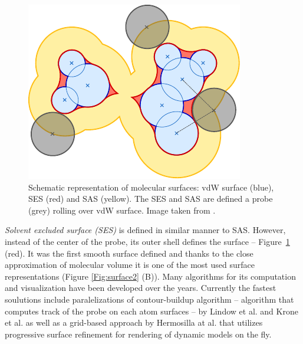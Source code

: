 \begin{figure} 
\vspace{-20pt}
\begin{center}
  \includegraphics[width=\linewidth]{pictures/surface.pdf} 
  \caption{Schematic representation of molecular surfaces: vdW surface (blue), SES (red) and SAS (yellow). The SES and SAS are defined a probe (grey) rolling over vdW surface. Image taken from \cite{kozlikova2015visualization}.}
  \label{Fig:surface}  
\end{center}
\vspace{-20pt}
\end{figure}

\textit{Solvent excluded surface (SES)} \cite{richards1977areas} is defined in similar manner to SAS. However, instead of the center of the probe, its outer shell defines the surface -- Figure~\ref{Fig:surface} (red). It was the first smooth surface defined and thanks to the close approximation of molecular volume it is one of the most used surface representations (Figure \ref{Fig:surface2} (B)). Many algorithms for its computation and visualization have been developed over the years. Currently the fastest soulutions include paralelizations of contour-buildup algorithm \cite{totrov1996contour} -- algorithm that computes track of the probe on each atom surfaces -- by Lindow et al. \cite{lindow2010accelerated} and Krone et al. \cite{6094043} as well as a grid-based approach by Hermosilla at al. \cite{hermosilla2017interactive} that utilizes progressive surface refinement for rendering of dynamic models on the fly.


